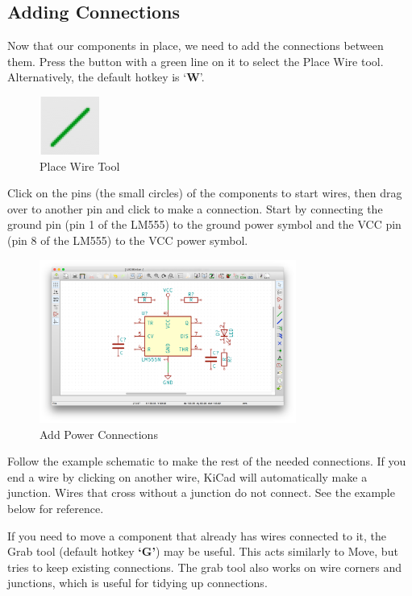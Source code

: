 \documentclass[12pt, oneside]{article}
\begin{document}
\subsection{Adding Connections}
Now that our components in place, we need to add the connections between them. Press the button with a green line on it to select the Place Wire tool. Alternatively, the default hotkey is `\textbf{W}'.

\begin{figure}[H]
\includegraphics{PlaceWire}
\centering
\caption{Place Wire Tool}
\end{figure}

Click on the pins (the small circles) of the components to start wires, then drag over to another pin and click to make a connection. Start by connecting the ground pin (pin 1 of the LM555) to the ground power symbol and the VCC pin (pin 8 of the LM555) to the VCC power symbol. 

\begin{figure}[H]
\includegraphics[width=0.75\textwidth]{ConnectPower}
\centering
\caption{Add Power Connections}
\end{figure}

Follow the example schematic to make the rest of the needed connections. If you end a wire by clicking on another wire, KiCad will automatically make a junction. Wires that cross without a junction do not connect. See the example below for reference.

If you need to move a component that already has wires connected to it, the Grab tool (default hotkey \textbf{`G'}) may be useful. This acts similarly to Move, but tries to keep existing connections. The grab tool also works on wire corners and junctions, which is useful for tidying up connections.
\end{document}
